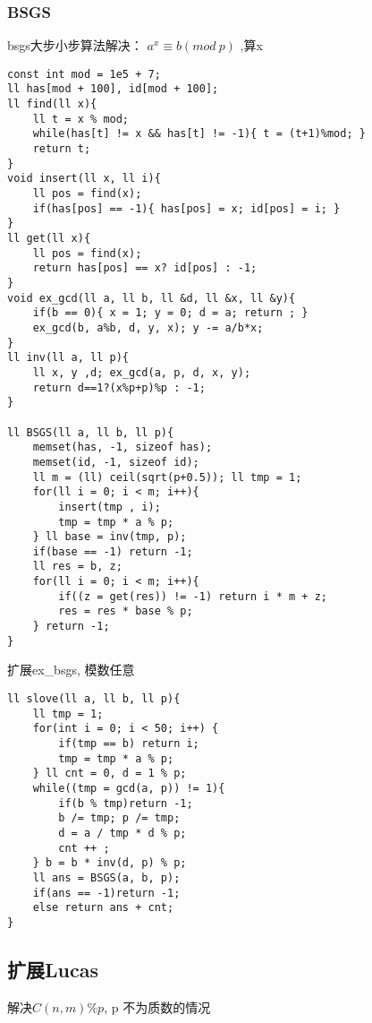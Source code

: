 \subsubsection{BSGS}
bsgs大步小步算法解决： $a^x \equiv b (mod \ p)$ ,算x

\begin{lstlisting}
const int mod = 1e5 + 7;
ll has[mod + 100], id[mod + 100];
ll find(ll x){
    ll t = x % mod;
    while(has[t] != x && has[t] != -1){ t = (t+1)%mod; }
    return t;
}
void insert(ll x, ll i){
    ll pos = find(x);
    if(has[pos] == -1){ has[pos] = x; id[pos] = i; }
}
ll get(ll x){
    ll pos = find(x);
    return has[pos] == x? id[pos] : -1;
}
void ex_gcd(ll a, ll b, ll &d, ll &x, ll &y){
    if(b == 0){ x = 1; y = 0; d = a; return ; }
    ex_gcd(b, a%b, d, y, x); y -= a/b*x;
}
ll inv(ll a, ll p){
    ll x, y ,d; ex_gcd(a, p, d, x, y);
    return d==1?(x%p+p)%p : -1;
}

ll BSGS(ll a, ll b, ll p){
    memset(has, -1, sizeof has);
    memset(id, -1, sizeof id);
    ll m = (ll) ceil(sqrt(p+0.5)); ll tmp = 1;
    for(ll i = 0; i < m; i++){
        insert(tmp , i);
        tmp = tmp * a % p;
    } ll base = inv(tmp, p);
    if(base == -1) return -1;
    ll res = b, z;
    for(ll i = 0; i < m; i++){
        if((z = get(res)) != -1) return i * m + z;
        res = res * base % p;
    } return -1;
}
\end{lstlisting}

扩展ex\_bsgs, 模数任意

\begin{lstlisting}
ll slove(ll a, ll b, ll p){
    ll tmp = 1;
    for(int i = 0; i < 50; i++) {
        if(tmp == b) return i;
        tmp = tmp * a % p;
    } ll cnt = 0, d = 1 % p;
    while((tmp = gcd(a, p)) != 1){
        if(b % tmp)return -1;
        b /= tmp; p /= tmp;
        d = a / tmp * d % p;
        cnt ++ ;
    } b = b * inv(d, p) % p;
    ll ans = BSGS(a, b, p);
    if(ans == -1)return -1;
    else return ans + cnt;
}

\end{lstlisting}

\subsection{扩展Lucas}

解决$C(n,m) \% p $, p 不为质数的情况

